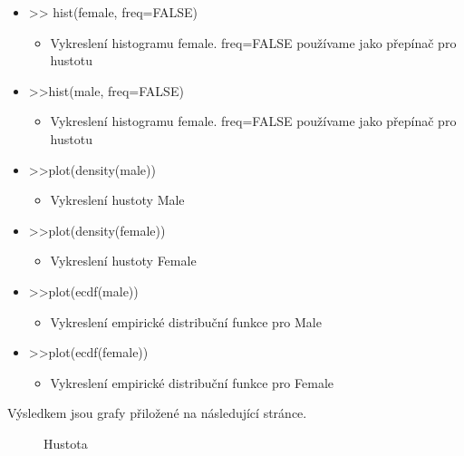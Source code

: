 \documentclass[paper=a4, fontsize=12pt]{scrartcl}
\numberwithin{equation}{section}		%
\numberwithin{figure}{section}			%
\numberwithin{table}{section}				%
\begin{document}
\begin{itemize}
	\item >> hist(female, freq=FALSE)
		\begin{itemize}
		\item Vykreslení histogramu female. freq=FALSE používame jako přepínač pro hustotu
		\end{itemize}
	\item >>hist(male, freq=FALSE)
		\begin{itemize}
	        \item Vykreslení histogramu female. freq=FALSE používame jako přepínač pro hustotu
		\end{itemize}
	\item >>plot(density(male))
		\begin{itemize}
		\item Vykreslení hustoty Male
		\end{itemize}
	\item >>plot(density(female))
		\begin{itemize}
		\item Vykreslení hustoty Female
		\end{itemize}
	\item >>plot(ecdf(male))
		\begin{itemize}
		\item Vykreslení empirické distribuční funkce pro Male
		\end{itemize}
	\item >>plot(ecdf(female))
		\begin{itemize}
		\item Vykreslení empirické distribuční funkce pro Female
		\end{itemize}
\end{itemize}
Výsledkem jsou grafy přiložené na následující stránce.%
\begin{figure}[H]%
    \centering
    \qquad
    \caption{Hustota}%
    \label{fig:example}%
\end{figure}
\end{document}
